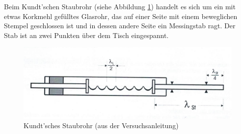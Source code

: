 \documentclass{scrartcl}
\begin{document}
Beim Kundt'schen Staubrohr (siehe Abbildung \ref{fig:Kundt}) handelt es sich um ein mit etwas Korkmehl gefülltes Glasrohr, das auf einer Seite mit einem beweglichen Stempel geschlossen ist und in dessen andere Seite ein Messingstab ragt. Der Stab ist an zwei Punkten über dem Tisch eingespannt.

\begin{figure}[h]
  \centering
    \includegraphics[scale=0.50]{Kundt.PNG}
  \caption{Kundt'sches Staubrohr (aus der Versuchsanleitung)}
  \label{fig:Kundt}
\end{figure}
\end{document}
